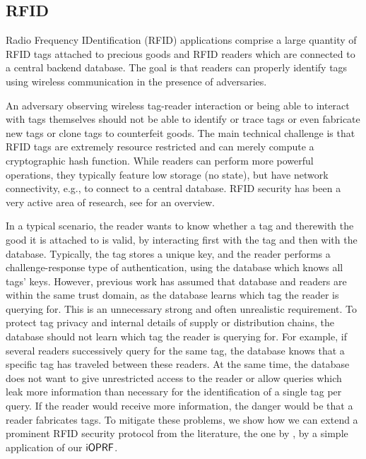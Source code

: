 \subsection{RFID}
Radio Frequency IDentification (RFID) applications comprise a large
quantity of RFID tags attached to precious goods and RFID readers
which are connected to a central backend database. The goal is that
readers can properly identify tags using wireless communication in the
presence of adversaries.

An adversary observing wireless tag-reader interaction or being able
to interact with tags themselves should not be able to identify or
trace tags or even fabricate new tags or clone tags to counterfeit
goods. The main technical challenge is that RFID tags are extremely
resource restricted and can merely compute a cryptographic hash
function. While readers can perform more powerful operations, they
typically feature low storage (no state), but have network
connectivity, e.g., to connect to a central database.  RFID security
has been a very active area of research, see \citet{juels} for an
overview.

In a typical scenario, the reader wants to know whether a tag and
therewith the good it is attached to is valid, by interacting first
with the tag and then with the database. Typically, the tag stores a
unique key, and the reader performs a challenge-response type of
authentication, using the database which knows all tags' keys.
However, previous work has assumed that database and readers are
within the same trust domain, as the database learns which tag the
reader is querying for.  This is an unnecessary strong and often
unrealistic requirement.  To protect tag privacy and internal details
of supply or distribution chains, the database should not learn which
tag the reader is querying for. For example, if several readers
successively query for the same tag, the database knows that a
specific tag has traveled between these readers. At the same time, the
database does not want to give unrestricted access to the reader or
allow queries which leak more information than necessary for the
identification of a single tag per query. If the reader would receive
more information, the danger would be that a reader fabricates tags.
To mitigate these problems, we show how we can extend a prominent RFID
security protocol from the literature, the one by \citet{molnar}, by a
simple application of our $\mathsf{i}\mathsf{OPRF}$.

